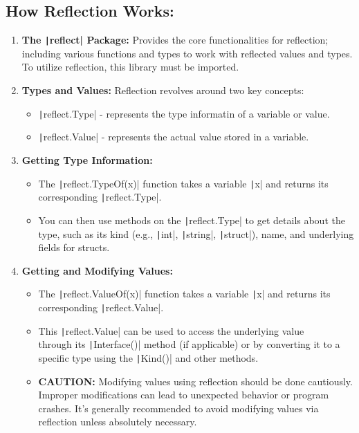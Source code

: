 \documentclass[letterpaper,12pt]{article}
\begin{document}
\subsection*{How Reflection Works:}
\begin{enumerate}
  \item \textbf{The \texttt|reflect| Package:} Provides the core functionalities for reflection; including various functions and types to work with reflected values and types. To utilize reflection, this library must be imported.
  \item \textbf{Types and Values:} Reflection revolves around two key concepts:
  \begin{itemize}
    \item \texttt|reflect.Type| - represents the type informatin of a variable or value.
    \item \texttt|reflect.Value| - represents the actual value stored in a variable.
  \end{itemize}
  \item \textbf{Getting Type Information:}
  \begin{itemize}
    \item The \texttt|reflect.TypeOf(x)| function takes a variable \texttt|x| and returns its corresponding \texttt|reflect.Type|.
    \item You can then use methods on the \texttt|reflect.Type| to get details about the type, such as its kind (e.g., \texttt|int|, \texttt|string|, \texttt|struct|), name, and underlying fields for structs.
  \end{itemize}
  \item \textbf{Getting and Modifying Values:}
  \begin{itemize}
    \item The \texttt|reflect.ValueOf(x)| function takes a variable \texttt|x| and returns its corresponding \texttt|reflect.Value|.
    \item This \texttt|reflect.Value| can be used to access the underlying value \\
    through its \texttt|Interface()| method (if applicable) or by converting it to a specific type using the \texttt|Kind()| and other methods.
    \item \textbf{CAUTION:} Modifying values using reflection should be done cautiously. Improper modifications can lead to unexpected behavior or program crashes. It's generally recommended to avoid modifying values via reflection unless absolutely necessary.
  \end{itemize}
\end{enumerate}
\end{document}
